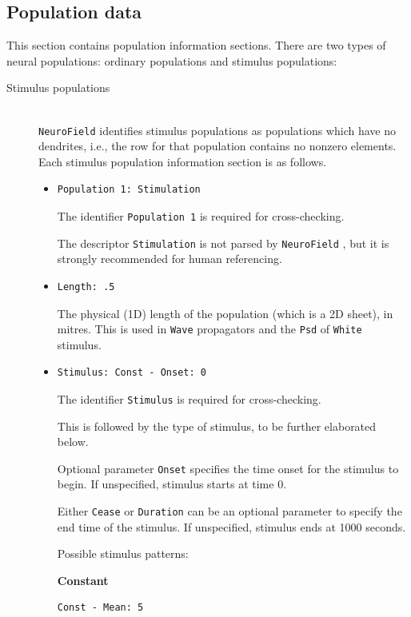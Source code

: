 \documentclass[12pt,a4paper]{article}
\newcommand{\type}[1]{ {\small\small\tt #1} }
\newcommand{\NF}[0]{ \type{NeuroField}}
\begin{document}
\subsection{Population data}
\label{sec:pop}
This section contains population information sections. There are two types of neural populations: ordinary populations and stimulus populations:
\begin{description}

\item[Stimulus populations]\ \\

\NF identifies stimulus populations as populations which have no dendrites, i.e., the row for that population contains no nonzero elements.  Each stimulus population information section is as follows.
\begin{itemize}
	\item \begin{lstlisting}
Population 1: Stimulation
	\end{lstlisting}
	The identifier \type{Population 1} is required for cross-checking.

	The descriptor \type{Stimulation} is not parsed by \NF, but it is strongly recommended for human referencing.
	\item
	\begin{lstlisting}
Length: .5
	\end{lstlisting}
	The physical (1D) length of the population (which is a 2D sheet), in mitres. This is used in \type{Wave} propagators and the \type{Psd} of \type{White} stimulus.
	\item
	\begin{lstlisting}
Stimulus: Const - Onset: 0
	\end{lstlisting}
	The identifier \type{Stimulus} is required for cross-checking.

	This is followed by the type of stimulus, to be further elaborated below.

	Optional parameter \type{Onset} specifies the time onset for the stimulus to begin. If unspecified, stimulus starts at time 0.

	Either \type{Cease} or \type{Duration} can be an optional parameter to specify the end time of the stimulus. If unspecified, stimulus ends at 1000 seconds.

	Possible stimulus patterns:

	\vspace{5mm}
	\textbf{Constant}
	\begin{lstlisting}
Const - Mean: 5
	\end{lstlisting}


\end{itemize}
\end{description}
\end{document}
